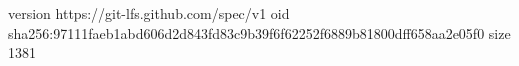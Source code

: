 version https://git-lfs.github.com/spec/v1
oid sha256:97111faeb1abd606d2d843fd83c9b39f6f62252f6889b81800dff658aa2e05f0
size 1381
